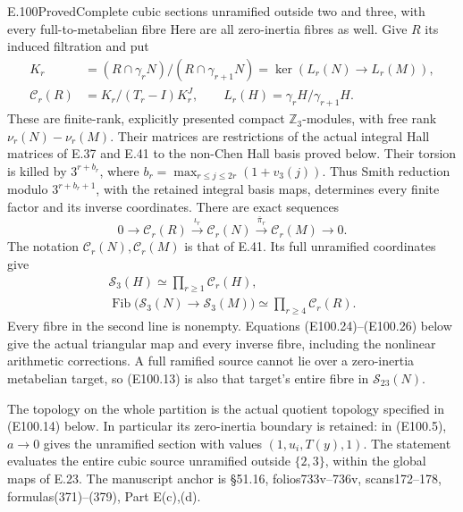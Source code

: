 \begin{statement}{E.100}{Proved}{Complete cubic sections unramified outside two and three, with every full-to-metabelian fibre}
Here are all zero-inertia fibres as well. Give $R$
its induced filtration and put
\[
\begin{aligned}
 K_r&=(R\cap\gamma_rN)/(R\cap\gamma_{r+1}N)
       =\ker(L_r(N)\to L_r(M)),\\
 \mathcal C_r(R)&=
       K_r/(T_r-I)K_r^J,\qquad
 L_r(H)=\gamma_rH/\gamma_{r+1}H .
\end{aligned}
 \tag{E100.11}
\]
These are finite-rank, explicitly presented compact
$\mathbb Z_3$-modules, with free rank
$\nu_r(N)-\nu_r(M)$. Their matrices are restrictions
of the actual integral Hall matrices of E.37 and
E.41 to the non-Chen Hall basis proved below.
Their torsion is killed by
$3^{r+b_r}$, where
$b_r=\max_{r\le j\le2r}(1+v_3(j))$.
Thus Smith reduction modulo $3^{r+b_r+1}$,
with the retained integral basis maps, determines
every finite factor and its inverse coordinates.
There are exact sequences
\[
 0\longrightarrow\mathcal C_r(R)
 \xrightarrow{\iota_r}\mathcal C_r(N)
 \xrightarrow{\bar\pi_r}\mathcal C_r(M)
 \longrightarrow0 .
 \tag{E100.12}
\]
The notation $\mathcal C_r(N),\mathcal C_r(M)$ is
that of E.41. Its full unramified coordinates give
\[
\begin{gathered}
 \mathscr S_3(H)\simeq\prod_{r\ge1}\mathcal C_r(H),\\
 \operatorname{Fib}\bigl(
      \mathscr S_3(N)\to\mathscr S_3(M)\bigr)
       \simeq\prod_{r\ge4}\mathcal C_r(R).
\end{gathered}
 \tag{E100.13}
\]
Every fibre in the second line is nonempty.
Equations (E100.24)--(E100.26) below give the
actual triangular map and every inverse fibre,
including the nonlinear arithmetic corrections.
A full ramified source cannot lie over a
zero-inertia metabelian target, so (E100.13)
is also that target's entire fibre in
$\mathscr S_{23}(N)$.

The topology on the whole partition is the actual
quotient topology specified in (E100.14) below.
In particular its zero-inertia boundary is retained:
in (E100.5), $a\to0$ gives the unramified section
with values $(1,u_i,T(y),1)$. The statement evaluates
the entire cubic source unramified outside
$\{2,3\}$, within the global maps of E.23.
The manuscript anchor is \S51.16, folios733v--736v,
scans172--178, formulas(371)--(379), Part E(c),(d).
\end{statement}

